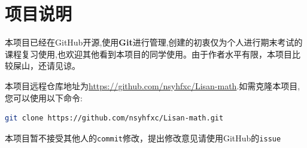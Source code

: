 \section{项目说明}

本项目已经在GitHub开源,使用\textbf{Git}进行管理,创建的初衷仅为个人进行期末考试的课程复习使用,也欢迎其他看到本项目的同学使用。由于作者水平有限，本项目比较屎山，还请见谅。

本项目远程仓库地址为\url{https://github.com/nsyhfxc/Lisan-math}.如需克隆本项目,您可以使用以下命令:

\begin{lstlisting}[language=bash]
	git clone https://github.com/nsyhfxc/Lisan-math.git
\end{lstlisting}

本项目暂不接受其他人的\texttt{commit}修改，提出修改意见请使用GitHub的\texttt{issue}